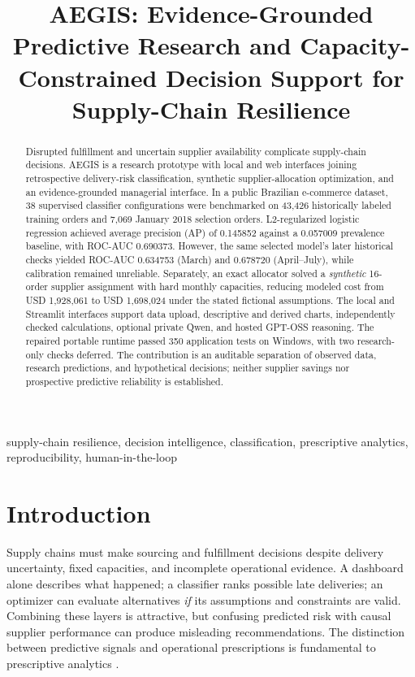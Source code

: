 \documentclass[conference,a4paper]{IEEEtran}
\begin{document}
\title{AEGIS: Evidence-Grounded Predictive Research and Capacity-Constrained Decision Support for Supply-Chain Resilience}
\author{
}
\maketitle
\begin{abstract}
Disrupted fulfillment and uncertain supplier availability complicate supply-chain decisions. AEGIS is a research prototype with local and web interfaces joining retrospective delivery-risk classification, synthetic supplier-allocation optimization, and an evidence-grounded managerial interface. In a public Brazilian e-commerce dataset, 38 supervised classifier configurations were benchmarked on 43,426 historically labeled training orders and 7,069 January 2018 selection orders. L2-regularized logistic regression achieved average precision (AP) of 0.145852 against a 0.057009 prevalence baseline, with ROC-AUC 0.690373. However, the same selected model's later historical checks yielded ROC-AUC 0.634753 (March) and 0.678720 (April--July), while calibration remained unreliable. Separately, an exact allocator solved a \emph{synthetic} 16-order supplier assignment with hard monthly capacities, reducing modeled cost from USD 1,928,061 to USD 1,698,024 under the stated fictional assumptions. The local and Streamlit interfaces support data upload, descriptive and derived charts, independently checked calculations, optional private Qwen, and hosted GPT-OSS reasoning. The repaired portable runtime passed 350 application tests on Windows, with two research-only checks deferred. The contribution is an auditable separation of observed data, research predictions, and hypothetical decisions; neither supplier savings nor prospective predictive reliability is established.
\end{abstract}
\begin{IEEEkeywords}
supply-chain resilience, decision intelligence, classification, prescriptive analytics, reproducibility, human-in-the-loop
\end{IEEEkeywords}

\section{Introduction}
Supply chains must make sourcing and fulfillment decisions despite delivery uncertainty, fixed capacities, and incomplete operational evidence. A dashboard alone describes what happened; a classifier ranks possible late deliveries; an optimizer can evaluate alternatives \emph{if} its assumptions and constraints are valid. Combining these layers is attractive, but confusing predicted risk with causal supplier performance can produce misleading recommendations. The distinction between predictive signals and operational prescriptions is fundamental to prescriptive analytics \cite{bertsimas2020}.
\end{document}
